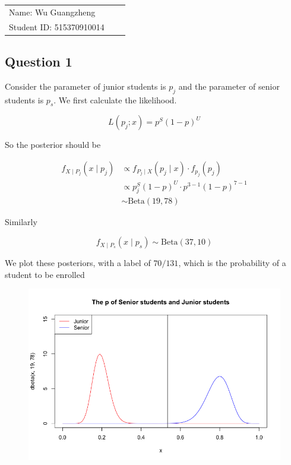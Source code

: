 \documentclass[12pt]{article}
\begin{document}
\vfill
\begin{large}

\begin{table}[h!]
\flushleft
\begin{tabular}{lll}
Name: Wu Guangzheng \hspace*{2em}\\
Student ID: 515370910014

\end{tabular}
\end{table}
\end{large}
\newpage
\begin{flushleft}


\section{Question 1} 

\qquad Consider the parameter of junior students is $p_j$ and the parameter of senior students is $p_s$. We first calculate the likelihood.

$$
L(p_j; x) = p^{S}(1-p)^{U}
$$

\qquad So the posterior should be

\vspace{-0.4cm}

\begin{align*}
f_{X\mid P_j}(x\mid p_j) &\propto f_{P_j \mid X}(p_j \mid x) \cdot f_{p_j}(p_j)\\
&\propto p_j^{S}(1-p)^{U} \cdot p^{3-1} (1-p)^{7-1}\\
&\sim \text{Beta}(19, 78)
\end{align*}

\qquad Similarly

$$
f_{X\mid P_s}(x\mid p_s) \sim \text{Beta}(37, 10)
$$

\qquad We plot these posteriors, with a label of $70/131$, which is the probability of a student to be enrolled

\begin{figure}[h]
\centering
\includegraphics[width = 0.7\linewidth]{Q1.png}
\end{figure}


\end{flushleft}
\end{document}
